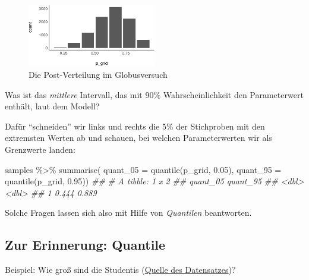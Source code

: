 \documentclass[
  a4paper,
  DIV=11]{scrreprt}
\newenvironment{Shaded}{\begin{snugshade}}{\end{snugshade}}
\newcommand{\AttributeTok}[1]{\textcolor[rgb]{0.40,0.45,0.13}{#1}}
\newcommand{\DocumentationTok}[1]{\textcolor[rgb]{0.37,0.37,0.37}{\textit{#1}}}
\newcommand{\FloatTok}[1]{\textcolor[rgb]{0.68,0.00,0.00}{#1}}
\newcommand{\FunctionTok}[1]{\textcolor[rgb]{0.28,0.35,0.67}{#1}}
\newcommand{\NormalTok}[1]{\textcolor[rgb]{0.00,0.23,0.31}{#1}}
\newcommand{\SpecialCharTok}[1]{\textcolor[rgb]{0.37,0.37,0.37}{#1}}
\theoremstyle{definition}
\theoremstyle{remark}
\begin{document}
\begin{figure}[H]

{\centering \includegraphics[width=0.5\textwidth,height=\textheight]{./Post_files/figure-pdf/fig-post99-1.pdf}

}

\caption{\label{fig-post99}Die Post-Verteilung im Globusversuch}

\end{figure}

Was ist das \emph{mittlere} Intervall, das mit 90\% Wahrscheinlichkeit
den Parameterwert enthält, laut dem Modell?

Dafür ``schneiden'' wir links und rechts die 5\% der Stichproben mit den
extremsten Werten ab und schauen, bei welchen Parameterwerten wir als
Grenzwerte landen:

\begin{Shaded}
\begin{Highlighting}[]
\NormalTok{samples }\SpecialCharTok{\%\textgreater{}\%} 
  \FunctionTok{summarise}\NormalTok{(}
    \AttributeTok{quant\_05 =} \FunctionTok{quantile}\NormalTok{(p\_grid, }\FloatTok{0.05}\NormalTok{),}
    \AttributeTok{quant\_95 =} \FunctionTok{quantile}\NormalTok{(p\_grid, }\FloatTok{0.95}\NormalTok{))}
\DocumentationTok{\#\# \# A tibble: 1 x 2}
\DocumentationTok{\#\#   quant\_05 quant\_95}
\DocumentationTok{\#\#      \textless{}dbl\textgreater{}    \textless{}dbl\textgreater{}}
\DocumentationTok{\#\# 1    0.444    0.889}
\end{Highlighting}
\end{Shaded}

Solche Fragen lassen sich also mit Hilfe von \emph{Quantilen}
beantworten.

\hypertarget{zur-erinnerung-quantile}{%
\subsection{Zur Erinnerung: Quantile}\label{zur-erinnerung-quantile}}

Beispiel: Wie groß sind die Studentis
(\href{https://rdrr.io/cran/openintro/man/speed_gender_height.html}{Quelle
des Datensatzes})?
\end{document}
